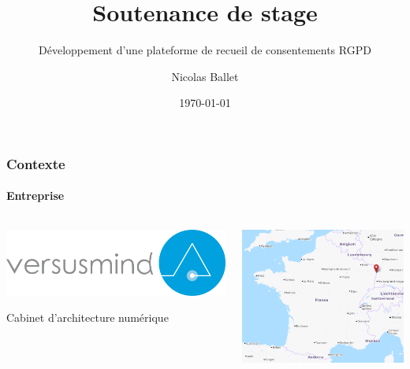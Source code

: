 \documentclass[aspectratio=169]{beamer}
\title[Développement d’une plateforme de recueil de consentements RGPD]{Soutenance de stage}
\subtitle{Développement d’une plateforme de recueil de consentements RGPD}
\author{Nicolas Ballet}
\institute[UTBM]{Université de Technologie de Belfort Montbéliard}
\date[\the\year-\twodigits\month-\twodigits\day]{\today}
\begin{document}
\begin{frame}
    \titlepage{}
\end{frame}
\begin{frame}
    \frametitle{Contexte}
    \framesubtitle{Entreprise}
    \begin{columns}
        \hfill
        \begin{column}{0.45\textwidth}
            \begin{center}
                \hfill\includegraphics[width=1.0\textwidth]{versusmind.png}
            \end{center}
            \hfill \color{gray} Cabinet d'architecture numérique   
        \end{column}
        \begin{column}{0.5\textwidth}
            \begin{center}
                \includegraphics[width=1.0\textwidth]{strasbourg.png}
            \end{center}
        \end{column}
    \end{columns}
\end{frame}
\end{document}
